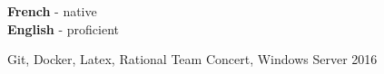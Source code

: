 \documentclass[10pt]{developercv} %
\begin{document}
\begin{minipage}[t]{0.5\textwidth}
	\vspace{-\baselineskip} %


	\textbf{French} - native\\
	\textbf{English} - proficient
\end{minipage}
\hfill
\begin{minipage}[t]{0.5\textwidth}
	\vspace{-\baselineskip} %


	{Git, Docker, Latex, Rational Team Concert, Windows Server 2016}

\end{minipage}

\end{document}
